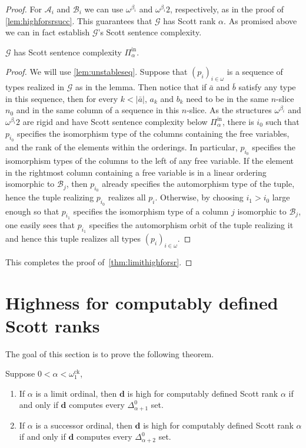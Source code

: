 \documentclass[10pt,a4paper]{amsart}
\newcommand\+[1]{\mathcal{#1}}
\renewcommand\*[1]{\mathbf{#1}}
\renewcommand\=[1]{\text{#1}}
\renewcommand\*[1]{\mathbf{#1}}
\newcommand{\Pinf}[1]{\Pi^{\mathrm{in}}_{#1}}
\newcommand{\ock}{\omega_{1}^{\mathrm{ck}}}
\newcommand{\nat}{\omega}
\begin{document}
\begin{proof}
   For $\+A_i$ and $\+B_i$ we can use $\omega^{\beta_i}$ and $\omega^{\beta_i}2$, respectively, as in the proof of \cref{lem:highforsrsucc}.
   This guarantees that $\+G$ has Scott rank $\alpha$. As promised above we can in fact establish $\+G$'s Scott sentence complexity.
     \begin{claim} $\+G$ has Scott sentence complexity $\Pinf{\alpha}$.\end{claim}
     \begin{proof}
       We will use \cref{lem:unstableseq}. Suppose that $(p_i)_{i\in\nat}$ is a sequence of types realized in $\+G$ as in the lemma. Then notice that if $\bar a$ and $\bar b$ satisfy any type in this sequence, then for every $k<|\bar a|$, $a_k$ and $b_k$ need to be in the same $n$-slice $n_0$ and in the same column of a sequence in this $n$-slice. As the structures $\omega^{\beta_i}$ and $\omega^{\beta_i}2$ are rigid and have Scott sentence complexity below $\Pinf{\alpha}$, there is $i_0$ such that $p_{i_0}$ specifies the isomorphism type of the columns containing the free variables, and the rank of the elements within the orderings. In particular, $p_{i_0}$ specifies the isomorphism types of the columns to the left of any free variable. If the element in the rightmost column containing a free variable is in a linear ordering isomorphic to $\+B_j$, then $p_{i_0}$ already specifies the automorphism type of the tuple, hence the tuple realizing $p_{i_0}$ realizes all $p_i$. Otherwise, by choosing $i_1>i_0$ large enough so that $p_{i_1}$ specifies the isomorphism type of a column $j$ isomorphic to $\+B_j$, one easily sees that $p_{i_1}$ specifies the automorphism orbit of the tuple realizing it and hence this tuple realizes all types $(p_i)_{i\in\nat}$.
     \end{proof}
     This completes the proof of~\cref{thm:limithighforsr}.
 \end{proof}
 
 \section{Highness for computably defined Scott ranks}\label{sec:cdSr}
 The goal of this section is to prove the following theorem.
 

 \begin{theorem}\label{thm:highforcompSR}
    Suppose $0 < \alpha < \ock$,
\begin{enumerate}
\item If $\alpha$ is a limit ordinal, then $\*d$ is high for computably defined Scott rank $\alpha$ if and only if $\*d$ computes every $\Delta^0_{\alpha+1}$ set.
\item If $\alpha$ is a successor ordinal, then $\*d$ is high for computably defined Scott rank $\alpha$ if and only if $\*d$ computes every $\Delta^0_{\alpha+2}$ set.
\end{enumerate}
\end{theorem}
\end{document}
